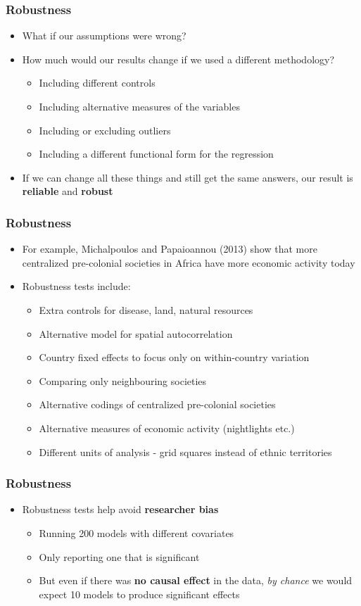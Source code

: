 \documentclass[xcolor=x11names,compress]{beamer}\usepackage[]{graphicx}\usepackage[]{xcolor}
\renewcommand{\(}{\begin{columns}}
\renewcommand{\)}{\end{columns}}
\newcommand{\<}[1]{\begin{column}{#1}}
\renewcommand{\>}{\end{column}}
\begin{document}
\begin{frame}
\frametitle{Robustness}
\begin{itemize}
\item What if our assumptions were wrong?
\pause
\item How much would our results change if we used a different methodology?
\pause
\begin{itemize}
\item Including different controls
\pause
\item Including alternative measures of the variables
\pause
\item Including or excluding outliers
\pause
\item Including a different functional form for the regression
\pause
\end{itemize}
\item If we can change all these things and still get the same answers, our result is \textbf{reliable} and \textbf{robust}
\end{itemize}
\end{frame}

\begin{frame}
\frametitle{Robustness}
\begin{itemize}
\item For example, Michalpoulos and Papaioannou (2013) show that more centralized pre-colonial societies in Africa have more economic activity today
\pause
\item Robustness tests include:
\begin{itemize}
\item Extra controls for disease, land, natural resources
\item Alternative model for spatial autocorrelation
\item Country fixed effects to focus only on within-country variation
\item Comparing only neighbouring societies
\item Alternative codings of centralized pre-colonial societies
\item Alternative measures of economic activity (nightlights etc.)
\item Different units of analysis - grid squares instead of ethnic territories
\end{itemize}
\end{itemize}
\end{frame}

\begin{frame}
\frametitle{Robustness}
\begin{itemize}
\item Robustness tests help avoid \textbf{researcher bias}
\pause
\begin{itemize}
\item Running 200 models with different covariates
\pause
\item Only reporting one that is significant
\pause
\item But even if there was \textbf{no causal effect} in the data, \textit{by chance} we would expect 10 models to produce significant effects
\end{itemize}
\end{itemize}
\end{frame}
\end{document}
